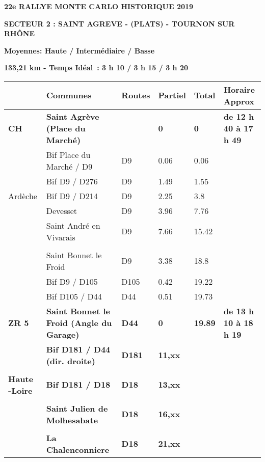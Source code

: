 \documentclass{article}%
\begin{document}
%
\normalsize%
\begin{center} \textbf{\LARGE{22e RALLYE MONTE CARLO HISTORIQUE 2019}} \end{center}%
\begin{flushleft} \textbf{SECTEUR 2 : SAINT AGREVE - (PLATS) - TOURNON SUR RHÔNE
} \end{flushleft}%
\begin{flushright} \textbf{             Moyennes: Haute / Intermédiaire / Basse
} \end{flushright}%
\begin{flushright} \textbf{133,21 km - Temps Idéal : 3 h 10 / 3 h 15 / 3 h 20
} \end{flushright}%
\begin{longtable}{p{2.25cm}|p{7.0cm}|p{1.5cm}|p{1.5cm}|p{1.5cm}|p{3.5cm}}%
\hline%
&Communes&Routes&Partiel&Total&Horaire Approx\\%
\hline%
\endhead%
\endfoot%
\endlastfoot%
\textbf{﻿CH}&\textbf{Saint Agrève (Place du Marché)}& &\textbf{0}&\textbf{0}&\textbf{de 12 h 40 à 17 h 49}\\%
 &Bif Place du Marché / D9&D9&0.06&0.06& \\%
 &Bif D9 / D276&D9&1.49&1.55& \\%
Ardèche&Bif D9 / D214&D9&2.25&3.8& \\%
 &Devesset&D9&3.96&7.76& \\%
 &Saint André en Vivarais&D9&7.66&15.42& \\%
\hline& & & & & \\%
 &Saint Bonnet le Froid&D9&3.38&18.8& \\%
 &Bif D9 / D105&D105&0.42&19.22& \\%
 &Bif D105 / D44&D44&0.51&19.73& \\%
\textbf{ZR 5}&\textbf{Saint Bonnet le Froid  (Angle du Garage) }&\textbf{D44 }&\textbf{0}&\textbf{19.89}&\textbf{de 13 h 10 à 18 h 19}\\%
 &\textbf{Bif D181 / D44 (dir. droite)}&\textbf{D181}&\textbf{11,xx}& & \\%
 & & & & & \\%
\textbf{Haute -Loire}&\textbf{Bif D181 / D18}&\textbf{D18}&\textbf{13,xx}& & \\%
 & & & & & \\%
 &\textbf{Saint Julien de Molhesabate }&\textbf{D18}&\textbf{16,xx}& & \\%
 & & & & & \\%
 &\textbf{La Chalenconniere}&\textbf{D18 }&\textbf{21,xx}& & \\%

\end{longtable}
\end{document}
